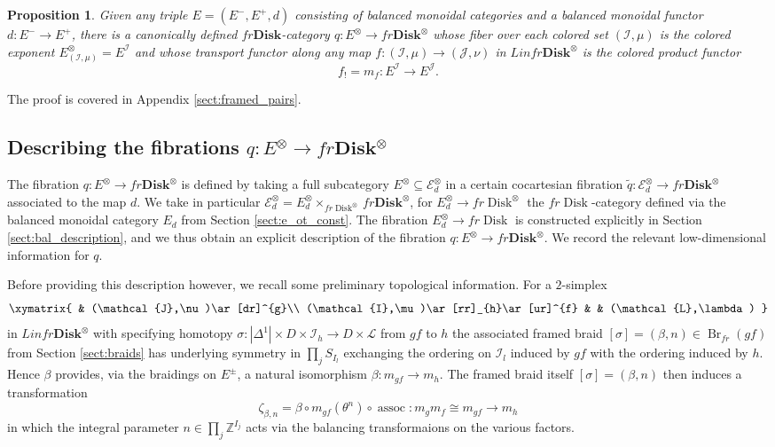 \documentclass[reqno]{amsart}
\newtheorem{proposition}[lemma]{Proposition}
\theoremstyle{definition}
\newcommand{\mcl}[1]{\mathcal{#1}}
\newcommand{\msc}[1]{\mathscr{#1}}
\newcommand{\opn}[1]{\operatorname{#1}}
\newcommand{\ot}{\otimes}
\newcommand{\Disk}{\mathbf{Disk}}
\renewcommand{\1}{\mathbf{1}}
\begin{document}
\begin{proposition}\label{prop:a_pm}
Given any triple $E=(E^-,E^+,d)$ consisting of balanced monoidal categories and a balanced monoidal functor $d:E^-\to E^+$, there is a canonically defined $fr\Disk$-category $q:E^{\ot}\to fr\Disk^{\ot}$ whose fiber over each colored set $(\mcl{I},\mu)$ is the colored exponent $E^{\ot}_{(\mcl{I},\mu)}=E^{\mcl{I}}$ and whose transport functor along any map $f:(\mcl{I},\mu)\to (\mcl{J},\nu)$ in $Linfr\Disk^{\ot}$ is the colored product functor
\[
f_!=m_f:E^{\mcl{I}}\to E^{\mcl{J}}.
\]
\end{proposition}

The proof is covered in Appendix \ref{sect:framed_pairs}.

\subsection{Describing the fibrations $q:E^{\ot}\to fr\Disk^{\ot}$}
\label{sect:A_ot_des}

The fibration $q:E^{\ot}\to fr\Disk^{\ot}$ is defined by taking a full subcategory $E^{\ot}\subseteq \msc{E}_d^{\ot}$ in a certain cocartesian fibration $\tilde{q}:\msc{E}_d^{\ot}\to fr\Disk^{\ot}$ associated to the map $d$.  We take in particular $\msc{E}^{\ot}_d=E^{\ot}_d\times_{fr\opn{Disk}^{\ot}}fr\Disk^{\ot}$, for $E_d^{\ot}\to fr\opn{Disk}^{\ot}$ the $fr\opn{Disk}$-category defined via the balanced monoidal category $E_d$ from Section \ref{sect:e_ot_const}. The fibration $E_d^{\ot}\to fr\opn{Disk}$ is constructed explicitly in Section \ref{sect:bal_description}, and we thus obtain an explicit description of the fibration $q:E^{\ot}\to fr\Disk^{\ot}$.  We record the relevant low-dimensional information for $q$.

Before providing this description however, we recall some preliminary topological information. For a $2$-simplex
\[
\xymatrix{
	& (\mcl{J},\nu)\ar[dr]^{g}\\
(\mcl{I},\mu)\ar[rr]_{h}\ar[ur]^{f} & & (\mcl{L},\lambda)
}
\]
in $Linfr\Disk^{\ot}$ with specifying homotopy $\sigma:|\Delta^1|\times D\times\mcl{I}_{h}\to D\times \mcl{L}$ from $gf$ to $h$ the associated framed braid $[\sigma]=(\beta,n)\in \opn{Br}_{fr}(gf)$ from Section \ref{sect:braids} has underlying symmetry in $\prod_jS_{I_l}$ exchanging the ordering on $\mcl{I}_l$ induced by $gf$ with the ordering induced by $h$.  Hence $\beta$ provides, via the braidings on $E^{\pm}$, a natural isomorphism $\beta:m_{gf}\to m_{h}$. The framed braid itself $[\sigma]=(\beta,n)$ then induces a transformation
\begin{equation}\label{eq:zeta_beta}
\zeta_{\beta,n}=\beta\circ m_{gf}(\theta^n)\circ \opn{assoc}:m_gm_f\cong m_{gf}\to m_h
\end{equation}
in which the integral parameter $n\in \prod_j\mathbb{Z}^{I_j}$ acts via the balancing transformaions on the various factors.
\par
\end{document}
